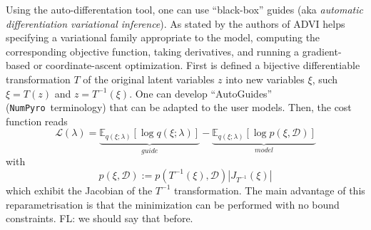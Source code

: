 \documentclass[twocolumn,twocolappendix,nofootinbib,iop]{openjournal}
\newcommand{\FrL}[1]{{\color{cyan}FL: #1}}
\newcommand{\numpyro}{\texttt{NumPyro}}
\newcommand{\bydef}{:=}
\begin{document}
Using the auto-differentation tool, one can use ``black-box'' guides (aka \textit{automatic differentiation variational inference}). As stated by the authors of \citep{2016arXiv160300788K} ADVI helps specifying a variational family appropriate to the model, computing the corresponding objective
function, taking derivatives, and running a gradient-based or coordinate-ascent optimization. First is defined a bijective differentiable transformation $T$ of the original latent variables $z$ into new variables $\xi$, such $\xi=T(z)$ and $z=T^{-1}(\xi)$. One can develop ``AutoGuides'' (\numpyro\ terminology) that can be adapted to the user models. Then, the cost function reads
\begin{equation}
\mathcal{L}(\lambda) = \underbrace{\mathbb{E}_{q(\xi;\lambda)}\left[ \log q(\xi;\lambda)\right]}_{guide} - \underbrace{\mathbb{E}_{q(\xi;\lambda)}\left[ \log p(\xi,\mathcal{D}) \right]}_{model}
\label{eq-loss-svi-2}
\end{equation}
with
\begin{equation}
p(\xi,\mathcal{D}) \bydef p(T^{-1}(\xi),\mathcal{D}) |J_{T^{-1}}(\xi)|
\end{equation}
which exhibit the Jacobian of the $T^{-1}$ transformation. The main advantage of this reparametrisation is that the minimization can be performed with no bound constraints. \FrL{we should say that before.}
\end{document}
